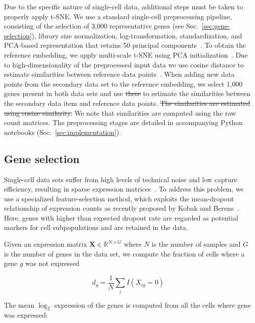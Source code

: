 \documentclass[runningheads]{llncs}
\providecommand{\DIFadd}[1]{{\protect\color{blue}\uwave{#1}}} %
\providecommand{\DIFdel}[1]{{\protect\color{red}\sout{#1}}}                      %
\providecommand{\DIFaddbegin}{} %
\providecommand{\DIFaddend}{} %
\providecommand{\DIFdelbegin}{} %
\providecommand{\DIFdelend}{} %
\newcommand{\DIFscaledelfig}{0.5}
\newlength{\DIFdelgraphicswidth} %
\newlength{\DIFdelgraphicsheight} %
\newcommand{\DIFaddincludegraphics}[2][]{{\color{blue}\fbox{\DIFOincludegraphics[#1]{#2}}}} %
\newcommand{\DIFdelincludegraphics}[2][]{%
\sbox{\DIFdelgraphicsbox}{\DIFOincludegraphics[#1]{#2}}%
\settoboxwidth{\DIFdelgraphicswidth}{\DIFdelgraphicsbox} %
\settoboxtotalheight{\DIFdelgraphicsheight}{\DIFdelgraphicsbox} %
\scalebox{\DIFscaledelfig}{%
\parbox[b]{\DIFdelgraphicswidth}{\usebox{\DIFdelgraphicsbox}\\[-\baselineskip] \rule{\DIFdelgraphicswidth}{0em}}\llap{\resizebox{\DIFdelgraphicswidth}{\DIFdelgraphicsheight}{%
\setlength{\unitlength}{\DIFdelgraphicswidth}%
\begin{picture}(1,1)%
\thicklines\linethickness{2pt} %
{\color[rgb]{1,0,0}\put(0,0){\framebox(1,1){}}}%
{\color[rgb]{1,0,0}\put(0,0){\line( 1,1){1}}}%
{\color[rgb]{1,0,0}\put(0,1){\line(1,-1){1}}}%
\end{picture}%
}\hspace*{3pt}}} %
} %
\DeclareRobustCommand{\DIFaddbegin}{\DIFOaddbegin \let\includegraphics\DIFaddincludegraphics} %
\DeclareRobustCommand{\DIFaddend}{\DIFOaddend \let\includegraphics\DIFOincludegraphics} %
\DeclareRobustCommand{\DIFdelbegin}{\DIFOdelbegin \let\includegraphics\DIFdelincludegraphics} %
\DeclareRobustCommand{\DIFdelend}{\DIFOaddend \let\includegraphics\DIFOincludegraphics} %
\begin{document}
Due to the specific nature of single-cell data, additional steps must be taken
to properly apply t-SNE. We use a standard single-cell preprocessing pipeline,
consisting of the selection of 3,000 representative genes (see
Sec.~\ref{sec:gene-selection}), library size normalization, log-transformation,
standardization, and PCA-based representation that retains 50 principal
components~\cite{seurat,scanpy}. To obtain the reference embedding, we apply
multi-scale t-SNE using PCA initialization~\cite{art_of_using_tsne}. Due to
high-dimensionality of the preprocessed input data we use cosine distance to
estimate similarities between reference data points~\cite{Domingos2012-CACM}.
When adding new data points from the secondary data set to the reference embedding,
we select 1,000 genes present in both data sets and use \DIFdelbegin \DIFdel{these }\DIFdelend \DIFaddbegin \DIFadd{the cosine similarity 
}\DIFaddend to estimate the similarities between the secondary data item and reference data
points.  \DIFdelbegin \DIFdel{The
similarities are estimated using cosine similarity. }\DIFdelend We note that similarities are computed using the raw count matrices.
The preprocessing stages are detailed in accompanying Python notebooks
(Sec.~\ref{sec:implementation}).

\subsection{Gene selection\label{sec:gene-selection}}

Single-cell data sets suffer from high levels of technical noise and low
capture efficiency, resulting in sparse expression matrices~\cite{umi}. To
address this problem, we use a specialized feature-selection method, which
exploits the mean-dropout relationship of expression counts as recently
proposed by Kobak and Berens~\cite{art_of_using_tsne}. Here, genes with higher
than expected dropout rate are regarded as potential markers for cell
subpopulations and are retained in the data.

Given an expression matrix $\mathbf{X} \in \mathbb{R}^{N \times G}$ where $N$
is the number of samples and $G$ is the number of genes in the data set, we
compute the fraction of cells where a gene $g$ was not expressed

\begin{equation}
d_g = \frac{1}{N} \sum_i I \left ( X_{ig} = 0\right )
\end{equation}

\noindent The mean $\log_2$ expression of the genes is computed from all the
cells where gene was expressed:
\end{document}
